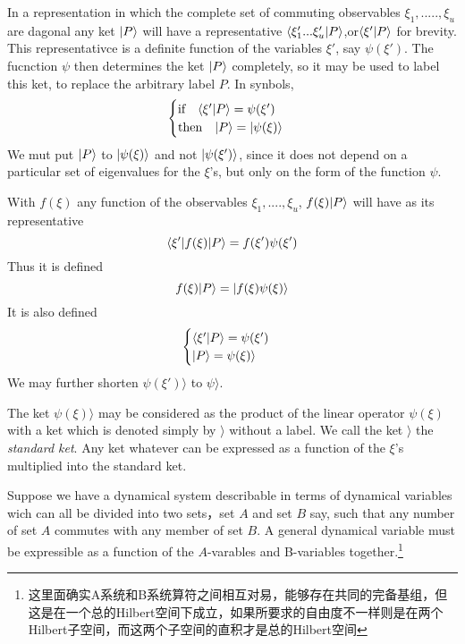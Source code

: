 In a representation in which the complete set of commuting observables $\xi_1,.....,\xi_u$ are dagonal any ket $| P \rangle$ will have a representative $\langle \xi'_1...\xi'_u | P \rangle$,or$\langle \xi' | P \rangle$ for brevity. This representativce is a definite function of the variables $\xi'$, say $\psi(\xi')$. The fucnction $\psi$ then determines the ket $| P \rangle$ completely, so it may be used to label this ket, to replace the arbitrary label $P$. In synbols,
	\begin{equation}
	\begin{cases}
	\text{if} \quad \langle \xi' | P \rangle = \psi(\xi')\\
	\text{then} \quad | P \rangle=| \psi(\xi) \rangle
	\end{cases}
	\end{equation}
	We mut put $| P \rangle$ to $| \psi(\xi) \rangle$ and not $| \psi(\xi') \rangle$, since it does not depend on a particular set of eigenvalues for the $\xi$'s, but only on the form of the function $\psi$.

	With $f(\xi)$ any function of the observables $\xi_1,....,\xi_u$, $f(\xi)| P \rangle$ will have as its representative
	\begin{equation}
	\langle \xi' | f(\xi) | P \rangle=f(\xi')\psi(\xi')
	\end{equation}
	Thus it is defined 
	\begin{equation}
	f(\xi)| P \rangle = | f(\xi)\psi(\xi) \rangle
	\end{equation}
	It is also defined
	\begin{equation}
	\begin{cases}
	\langle \xi' | P \rangle=\psi(\xi')\\
	| P \rangle=\psi(\xi)\rangle
	\end{cases}
	\end{equation}
	We may further shorten $\psi(\xi') \rangle$ to $\psi \rangle$.

	The ket $\psi(\xi)\rangle$ may be considered as the product of the linear operator $\psi(\xi)$ with a ket which is denoted simply by $\rangle$ without a label. We call the ket $\rangle$ the \emph{standard ket}. Any ket whatever can be expressed as a function of the $\xi$'s multiplied into the standard ket. 


	Suppose we have a dynamical system describable in terms of dynamical variables wich can all be divided into two sets，set $A$ and set $B$ say, such that any number of set $A$ commutes with any member of set $B$. A general dynamical variable must be expressible as a function of the $A$-varables and B-variables together.\footnote{这里面确实A系统和B系统算符之间相互对易，能够存在共同的完备基组，但这是在一个总的Hilbert空间下成立，如果所要求的自由度不一样则是在两个Hilbert子空间，而这两个子空间的直积才是总的Hilbert空间}


